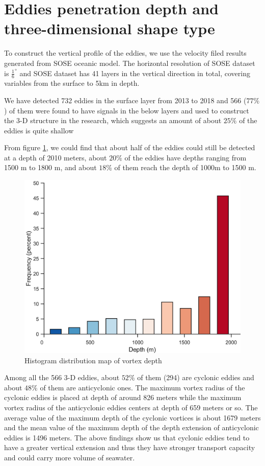 \section{Eddies penetration depth and three-dimensional shape type}

To construct the vertical profile of the eddies, we use the velocity filed results generated from SOSE oceanic model. The horizontal resolution of SOSE dataset is $ \frac{1}{6}^{\circ} $ and SOSE dataset has 41 layers in the vertical direction in total, covering variables from the surface to 5km in depth.

We have detected 732 eddies in the surface layer from 2013 to 2018 and 566 ($77\%$) of them were found to have signals in the below layers and  used to construct the 3-D structure in the research, which suggests an amount of about $25\%$ of the eddies is quite shallow

From figure \ref{Depth Frequency.png}, we could find that about half of the eddies could still be detected at a depth of 2010 meters, about $20\%$ of the eddies have depths ranging from 1500 m to 1800 m, and about $18\%$ of them reach the depth of 1000m to 1500 m.

\begin{figure}[htbp]
    \centering
    \includegraphics[width =12cm]{chapter/figure/Depth Frequency.png}
    \caption{Histogram distribution map of vortex depth}
    \label{Depth Frequency.png}
\end{figure}

Among all the 566 3-D eddies, about $52\%$ of them (294) are cyclonic eddies and about $48\%$ of them are anticyclonic ones. The maximum vortex radius of the cyclonic eddies is placed at depth of around 826 meters while the maximum vortex radius of the anticyclonic eddies centers at depth of 659 meters or so. The average value of the maximum depth of the cyclonic vortices is about 1679 meters and the mean value of the maximum depth of the depth extension of anticyclonic eddies is 1496 meters. The above findings show us that cyclonic eddies tend to have a greater vertical extension and thus they have stronger transport capacity and could carry more volume of seawater.

